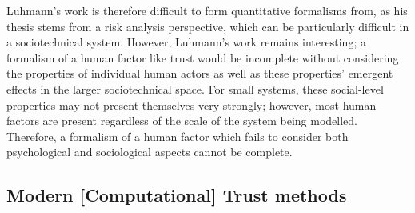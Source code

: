 Luhmann's work is therefore difficult to form quantitative formalisms from, as his thesis stems from a risk analysis perspective, which can be particularly difficult in a sociotechnical system. However, Luhmann's work remains interesting; a formalism of a human factor like trust would be incomplete without considering the properties of individual human actors as well as these properties' emergent effects in the larger sociotechnical space. For small systems, these social-level properties may not present themselves very strongly; however, most human factors are present regardless of the scale of the system being modelled. Therefore, a formalism of a human factor which fails to consider both psychological and sociological aspects cannot be complete. \par

\subsection{Modern [Computational] Trust methods}
